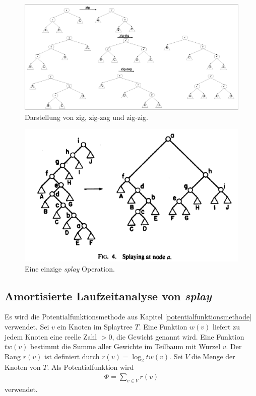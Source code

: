 \documentclass[a4paper,12pt]{article}
\begin{document}
\begin{figure}[h]
	\centering
	\includegraphics[width= 1.2\textwidth]{"Medien/Splaybaum/zigZag"}
	\caption{Darstellung von zig, zig-zag und zig-zig. }
	\label{fig:zigZag}
\end{figure}
\begin{figure}[h]
	\centering
	\includegraphics[width= 1\textwidth]{"Medien/Splaybaum/splay"}
	\caption{Eine einzige \textit{splay } Operation.\cite{splay}}
	\label{fig:splay}
\end{figure}

\subsection{Amortisierte Laufzeitanalyse von \textit{splay }}
Es wird die Potentialfunktionsmethode aus Kapitel \ref{potentialfunktionsmethode} verwendet. Sei $v$ ein Knoten im Splaytree $T$. Eine Funktion $w\left(v\right)$ liefert zu jedem Knoten eine reelle Zahl $>0$, die Gewicht genannt wird. Eine Funktion $\mathit{tw}\left(v\right)$ bestimmt die Summe aller Gewichte im Teilbaum mit Wurzel $v$. Der Rang  $r\left(v\right)$ ist definiert durch $r\left(v\right) = \log_2  \mathit{tw}\left(v\right)$. Sei $V$ die Menge der Knoten von $T$. Als Potentialfunktion wird 
\begin{align*}
\Phi = \sum_{v \in V} r\left(v\right)
\end{align*}
verwendet.
\end{document}

